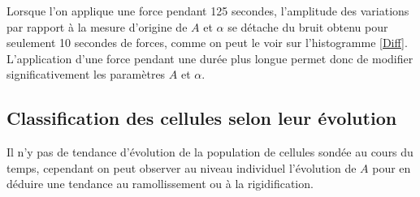 \documentclass{report}
\begin{document}
Lorsque l'on applique une force pendant 125 secondes, l'amplitude des variations par rapport à la mesure d'origine de $A$ et $\alpha$ se détache du bruit obtenu pour seulement 10 secondes de forces, comme on peut le voir sur l'histogramme \ref{Diff}. L'application d'une force pendant une durée plus longue permet donc de modifier significativement les paramètres $A$ et $\alpha$. 

\subsection{Classification des cellules selon leur évolution}

Il n'y pas de tendance d'évolution de la population de cellules sondée au cours du temps, cependant on peut observer au niveau individuel l'évolution de $A$ pour en déduire une tendance au ramollissement ou à la rigidification. 
\end{document}
